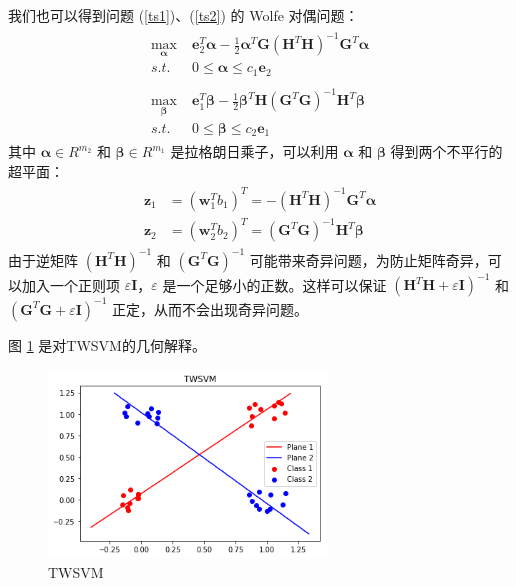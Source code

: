 我们也可以得到问题 (\ref{ts1})、(\ref{ts2}) 的 Wolfe 对偶问题：
\begin{align}
\begin{split}
\max\limits_{\pmb{\alpha}} \; & \mathbf{e}_2^T \pmb{\alpha}-\frac{1}{2}\pmb{\alpha}^T\mathbf{G}(\mathbf{H}^T\mathbf{H})^{-1}\mathbf{G}^T\pmb{\alpha} \\
s.t. \; & 0 \leq \pmb{\alpha}\leq c_1 \mathbf{e}_2
\end{split}
\\
\begin{split}
\max\limits_{\pmb{\beta}} \; & \mathbf{e}_1^T \pmb{\beta}-\frac{1}{2}\pmb{\beta}^T\mathbf{H}(\mathbf{G}^T\mathbf{G})^{-1}\mathbf{H}^T\pmb{\beta} \\
s.t. \; & 0 \leq \pmb{\beta} \leq c_2\mathbf{e}_1
\end{split}
\end{align}
其中 $\mathbf{\alpha} \in R^{m_2}$ 和 $\mathbf{\beta}\in R^{m_1}$ 是拉格朗日乘子，可以利用 $\mathbf{\alpha}$ 和 $\mathbf{\beta}$ 得到两个不平行的超平面：
\begin{align}
\begin{split}
\mathbf{z}_1 &= (\mathbf{w}^T_1b_1)^T = -(\mathbf{H}^T\mathbf{H})^{-1} \mathbf{G}^
T\pmb{\alpha} \\
\mathbf{z}_2 &= (\mathbf{w}^T_2b_2)^T = (\mathbf{G}^T\mathbf{G})^{-1} \mathbf{H}^T\pmb{\beta}
\end{split}
\end{align}
由于逆矩阵 $(\mathbf{H}^T\mathbf{H})^{-1}$ 和 $(\mathbf{G}^T\mathbf{G})^{-1}$ 可能带来奇异问题，为防止矩阵奇异，可以加入一个正则项 $\varepsilon \mathbf{I}$，$\varepsilon$ 是一个足够小的正数。这样可以保证 $(\mathbf{H}^T\mathbf{H}+\varepsilon \mathbf{I})^{-1}$ 和 $(\mathbf{G}^T\mathbf{G}+\varepsilon \mathbf{I})^{-1}$ 正定，从而不会出现奇异问题。

图 \ref{twsvm1} 是对TWSVM的几何解释。
\begin{figure}[ht]
\centering
\includegraphics[height=5cm]{./img/TWSVM-img.png}
\caption{TWSVM}
\label{twsvm1}
\end{figure}
